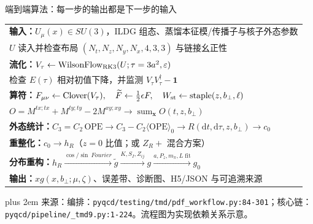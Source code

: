 \documentclass[UTF8,aspectratio=169,11pt]{ctexbeamer}
\newcommand{\source}[1]{%
  \par\vspace{0.02em}\begingroup\fontsize{6}{6.8}\selectfont\raggedright\sloppy
  \setlength{\emergencystretch}{3em}\rightskip=0pt plus 2em
  \color{muted}来源：#1\par\endgroup}
\begin{document}
\begin{frame}[t]{端到端算法：每一步的输出都是下一步的输入}
  \centering
  \small
  \begin{tabular}{@{}l@{}}
    \textbf{输入：}\(U_\mu(x)\in SU(3)\)，ILDG 组态、蒸馏本征模/传播子与核子外态参数\\
    \quad \(U\) 读入并检查布局 \((N_t,N_z,N_y,N_x,4,3,3)\) 与链接幺正性\\
    \textbf{流化：}\(V_\tau\leftarrow\operatorname{WilsonFlow}_{\rm RK3}(U;\tau=3a^2,\varepsilon)\)\\
    \quad 检查 \(E(\tau)\) 相对初值下降，并监测 \(V_\tau V_\tau^\dagger-\mathbf1\)\\
    \textbf{算符：}\(F_{\mu\nu}\leftarrow\operatorname{Clover}(V_\tau),\quad
      \widetilde F\leftarrow\tfrac12\epsilon F,\quad W_{\rm st}\leftarrow\operatorname{staple}(z,b_\perp,\ell)\)\\
    \quad \(O=M^{tx;tx}+M^{ty;ty}-2M^{xy;xy}\to\operatorname{sum}_{\boldsymbol x}O(t,z,b_\perp)\)\\
    \textbf{外态统计：}\(C_3=C_2\,\mathrm{OPE}\to C_3-C_2\langle\mathrm{OPE}\rangle_0
      \to R(\mathrm dt,\mathrm d\tau,z,b_\perp)\to c_0\)\\
    \textbf{重整化：}\(c_0\to h_R\)（\(z=0\) 比值；或 \(Z_R+\) 混合方案）\\
    \textbf{分布重构：}\(h_R\xrightarrow{\cos/\sin\ Fourier}\widetilde g
      \xrightarrow{K,S_I,Z_{ij}}g\xrightarrow{a,P_z,m_\pi,L\;\mathrm{fit}}g_0\)\\
    \textbf{输出：}\(xg(x,b_\perp;\mu,\zeta)\)、误差带、诊断图、H5/JSON 与可追溯来源
  \end{tabular}
  \vfill
  \source{编排：\nolinkurl{pyqcd/testing/tmd/pdf_workflow.py:84-301}；核心链：\nolinkurl{pyqcd/pipeline/_tmd9.py:1-224}。流程图为实现依赖关系示意。}
\end{frame}
\end{document}
